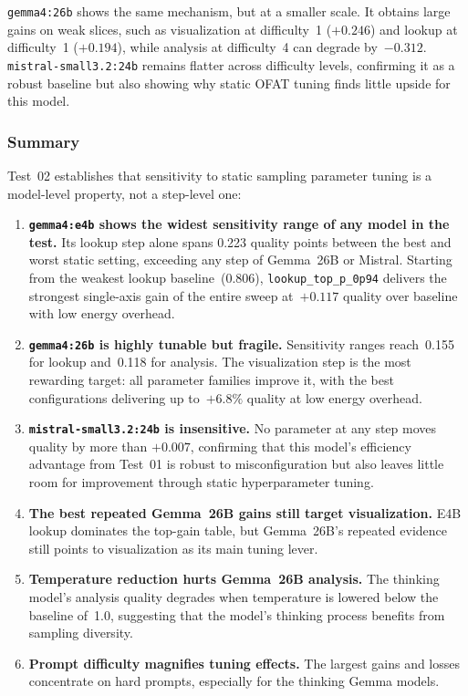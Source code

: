 \texttt{gemma4:26b} shows the same mechanism, but at a
smaller scale. It obtains large gains on weak slices, such as visualization at
difficulty~1 ($+0.246$) and lookup at difficulty~1 ($+0.194$), while analysis
at difficulty~4 can degrade by~$-0.312$. \texttt{mistral-\allowbreak small3.2:24b} remains
flatter across difficulty levels, confirming it as a robust baseline but also
showing why static OFAT tuning finds little upside for this model.

\subsubsection{Summary}

Test~02 establishes that sensitivity to static sampling parameter tuning
is a model-level property, not a step-level one:

\begin{enumerate}
    \item \textbf{\texttt{gemma4:e4b} shows the widest sensitivity range of
          any model in the test.} Its lookup step alone spans 0.223 quality
          points between the best and worst static setting, exceeding any step
          of Gemma~26B or Mistral. Starting from the weakest lookup
          baseline~(0.806), \texttt{lookup\_top\_p\_0p94} delivers the
          strongest single-axis gain of the entire sweep at~$+0.117$ quality
          over baseline with low energy overhead.

    \item \textbf{\texttt{gemma4:26b} is highly tunable but fragile.}
          Sensitivity ranges reach~0.155 for lookup and~0.118 for analysis.
          The visualization step is the most rewarding target: all parameter
          families improve it, with the best configurations delivering up
          to~$+6.8\%$ quality at low energy overhead.

    \item \textbf{\texttt{mistral-\allowbreak small3.2:24b} is insensitive.}
          No parameter at any step moves quality by more than $+0.007$,
          confirming that this model's efficiency advantage from Test~01
          is robust to misconfiguration but also leaves little room for
          improvement through static hyperparameter tuning.

    \item \textbf{The best repeated Gemma~26B gains still target
          visualization.} E4B lookup dominates the top-gain table, but
          Gemma~26B's repeated evidence still points to visualization as its
          main tuning lever.

    \item \textbf{Temperature reduction hurts Gemma~26B analysis.}
          The thinking model's analysis quality degrades when temperature
          is lowered below the baseline of~1.0, suggesting that the
          model's thinking process benefits from sampling diversity.

    \item \textbf{Prompt difficulty magnifies tuning effects.} The largest
          gains and losses concentrate on hard prompts, especially for the
          thinking Gemma models.
\end{enumerate}

